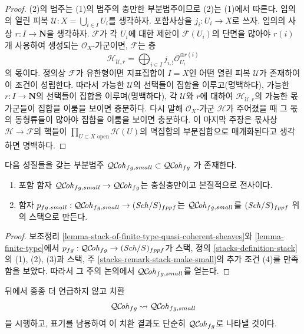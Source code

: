 \begin{proof}
(2)의 범주는 (1)의 범주의 충만한 부분범주이므로 (2)는 (1)에서 따른다.
임의의 열린 피복 $\mathcal{U} : X = \bigcup_{i \in I} U_i$를 생각하자.
포함사상을 $j_i : U_i \to X$로 쓰자. 임의의 사상
$r : I \to \mathbf{N}$을 생각하자. $\mathcal{F}$가 각 $U_i$에 대한 제한이
$\mathcal{F}(U_i)$의 단면을 많아야 $r(i)$개 사용하여 생성되는
$\mathcal{O}_X$-가군이면, $\mathcal{F}$는 층
$$
\mathcal{H}_{\mathcal{U}, r} =
\bigoplus\nolimits_{i \in I} j_{i, !}\mathcal{O}_{U_i}^{\oplus r(i)}
$$
의 몫이다. 정의상 $\mathcal{F}$가 유한형이면 지표집합이 $I = X$인 어떤
열린 피복 $\mathcal{U}$가 존재하여 이 조건이 성립한다. 따라서 가능한
$\mathcal{U}$의 선택들이 집합을 이루고(명백하다), 가능한
$r : I \to \mathbf{N}$의 선택들이 집합을 이루며(명백하다), 각
$\mathcal{U}$와 $r$에 대하여 $\mathcal{H}_{\mathcal{U}, r}$의 가능한 몫
가군들이 집합을 이룸을 보이면 충분하다. 다시 말해
$\mathcal{O}_X$-가군 $\mathcal{H}$가 주어졌을 때 그 몫의 동형류들이 많아야
집합을 이룸을 보이면 충분하다. 이 마지막 주장은 몫사상
$\mathcal{H} \to \mathcal{F}$의 핵들이
$\prod_{U \subset X\text{ open}} \mathcal{H}(U)$의 멱집합의 부분집합으로
매개화된다고 생각하면 명백하다.
\end{proof}

\begin{lemma}
\label{lemma-stack-fg-quasi-coherent}
다음 성질들을 갖는 부분범주
$\mathcal{QC}\!\mathit{oh}_{fg, small} \subset \mathcal{QC}\!\mathit{oh}_{fg}$
가 존재한다.
\begin{enumerate}
\item 포함 함자 $\mathcal{QC}\!\mathit{oh}_{fg, small} \to \mathcal{QC}\!\mathit{oh}_{fg}$는
충실충만이고 본질적으로 전사이다.
\item 함자 $p_{fg, small} : \mathcal{QC}\!\mathit{oh}_{fg, small} \to (\mathit{Sch}/S)_{fppf}$는
$\mathcal{QC}\!\mathit{oh}_{fg, small}$를 $(\mathit{Sch}/S)_{fppf}$ 위의 스택으로 만든다.
\end{enumerate}
\end{lemma}

\begin{proof}
보조정리 \ref{lemma-stack-of-finite-type-quasi-coherent-sheaves}와
\ref{lemma-finite-type}에서 $p_{fg} : \mathcal{QC}\!\mathit{oh}_{fg} \to (\mathit{Sch}/S)_{fppf}$가
스택, 정의 \ref{stacks-definition-stack}의 (1), (2), (3)과 스택, 주
\ref{stacks-remark-stack-make-small}의 추가 조건 (4)를 만족함을 보았다.
따라서 그 주의 논의에서 $\mathcal{QC}\!\mathit{oh}_{fg, small}$를 얻는다.
\end{proof}

\noindent
뒤에서 종종 더 언급하지 않고 치환
$$
\mathcal{QC}\!\mathit{oh}_{fg} \leadsto \mathcal{QC}\!\mathit{oh}_{fg, small}
$$
을 시행하고, 표기를 남용하여 이 치환 결과도 단순히 $\mathcal{QC}\!\mathit{oh}_{fg}$로
나타낼 것이다.

